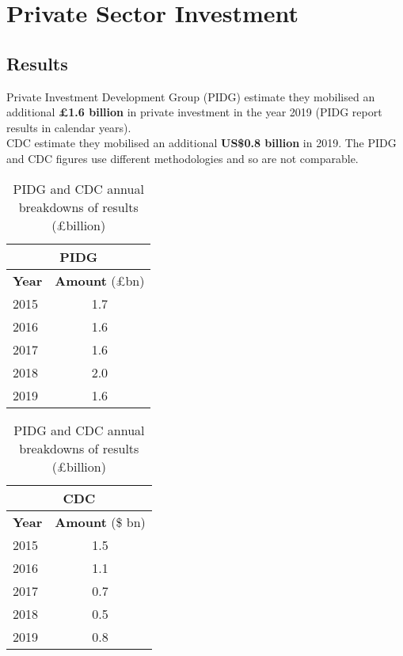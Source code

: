 \chapter{Private Sector Investment}

\section*{}


\thispagestyle{empty}


\section{Results}

Private Investment Development Group (PIDG) estimate they mobilised an additional \textbf{\pounds 1.6 billion} in private investment in the year 2019 (PIDG report results in calendar years). \\%

\noindent CDC estimate they mobilised an additional \textbf{US\$0.8 billion} in 2019. %
The PIDG and CDC figures use different methodologies and so are not comparable. %


\begin{table}[htbp]
  \centering
  \caption{PIDG and CDC annual breakdowns of results (\pounds billion)}\label{tab:private_pidg}
  \begin{tabular}{lc}
    \toprule
    \multicolumn{2}{c}{\textbf{PIDG}} \\ \hline
    \multicolumn{1}{c}{\textbf{Year}} & \textbf{Amount} (\pounds bn) \\ \hline
    \rule{0pt}{10pt}2015 & 1.7 \\
    2016 & 1.6 \\
    2017 & 1.6 \\
    2018 & 2.0 \\
    2019 & 1.6 \\ \bottomrule
  \end{tabular}
    \hspace{1em}
  \begin{tabular}{lc}
    \toprule
    \multicolumn{2}{c}{\textbf{CDC}}  \\  \hline
    \multicolumn{1}{c}{\textbf{Year}} & \textbf{Amount} (\$ bn) \\  \hline
    \rule{0pt}{10pt}2015 & 1.5 \\
    2016 & 1.1 \\
    2017 & 0.7 \\
    2018 & 0.5 \\
    2019 & 0.8 \\ \bottomrule
  \end{tabular}
\end{table}



